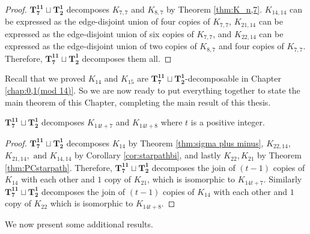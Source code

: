 \begin{proof}
    $\mathbf{T_{7}^{11}}\sqcup\mathbf{T_{2}^{1}}$ decomposes $K_{7,7}$ and $K_{8,7}$ by Theorem \ref{thm:K_n,7}. $K_{14,14}$ can be expressed as the edge-disjoint union of four copies of $K_{7,7}$, $K_{21,14}$ can be expressed as the edge-disjoint union of six copies of $K_{7,7}$, and $K_{22,14}$ can be expressed as the edge-disjoint union of two copies of $K_{8,7}$ and four copies of $K_{7,7}$. Therefore, $\mathbf{T_{7}^{11}}\sqcup\mathbf{T_{2}^{1}}$ decomposes them all.
\end{proof}
Recall that we proved $K_{14}$ and $K_{15}$ are $\mathbf{T_{7}^{11}}\sqcup\mathbf{T_{2}^{1}}$-decomposable in Chapter \ref{chap:0,1(mod 14)}. So we are now ready to put everything together to state the main theorem of this Chapter, completing the main result of this thesis.
\begin{thm}
$\mathbf{T_{7}^{11}}\sqcup\mathbf{T_{2}^{1}}$ decomposes $K_{14t+7}$ and $K_{14t+8}$ where $t$ is a positive integer. 
\end{thm}
\begin{proof}
$\mathbf{T_{7}^{11}}\sqcup\mathbf{T_{2}^{1}}$ decomposes $K_{14}$ by Theorem \ref{thm:sigma plus minus}, $K_{22,14}$, $K_{21,14},\text{ and }K_{14,14}$ by Corollary \ref{cor:starpathbi}, and lastly $K_{22},K_{21}$ by Theorem \ref{thm:PCstarpath}.
\newline\newline
Therefore, $\mathbf{T_{7}^{11}}\sqcup\mathbf{T_{2}^{1}}$ decomposes the join of $(t-1)$ copies of $K_{14}$ with each other and $1$ copy of $K_{21}$, which is isomorphic to $K_{14t+7}$. Similarly $\mathbf{T_{7}^{11}}\sqcup\mathbf{T_{2}^{1}}$ decomposes the join of $(t-1)$ copies of $K_{14}$ with each other and $1$ copy of $K_{22}$ which is isomorphic to $K_{14t+8}$.
\end{proof}

We now present some additional results. 